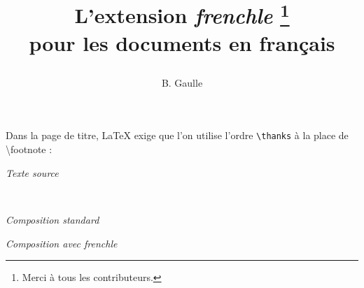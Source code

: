 \documentclass[a4paper,12pt,openright]{article}
\begin{document}
Dans la page de titre, \LaTeX{} exige que l’on utilise l’ordre \texttt{{\backslash}thanks} à la place
de {\backslash}footnote :
\begin{center} %
\textit{Texte source}\\[.3ex]
\begin{boxedverbatim}
\title{L’extension \textit{frenchle}
\thanks{Merci à tous les contributeurs.} \\
pour les documents en français
\author{B. Gaulle}
}
\maketitle
\end{boxedverbatim}
\\[.5ex]
\setcounter{mpfootnote}{1} %
\renewcommand{\thempfootnote}{\arabic{mpfootnote}}
\parbox{70mm}{
\begin{center}
\textit{Composition standard}
%
\end{center}
}%
\parbox{70mm}{
\begin{center}
\textit{Composition avec frenchle}
\fbox{\frenchtypography\frenchlayout%
\begin{tabular}{@{}ll@{}l@{}}
\multicolumn{3}{@{}c}{\large L'extension \textit{frenchle}\footnotemark[1]}\\
\multicolumn{3}{@{}c}{\large pour les documents en français}\\
&\rule{5em}{0pt}\\
\multicolumn{3}{@{}c}{\rule{0pt}{1em}B. Gaulle}\\
\multicolumn{3}{@{}c}{\rule{0pt}{2em}}\\\cline{1-2}
&\multicolumn{2}{l}{\rule{0pt}{1em}\footnotesize1. {Merci à tous les contributeurs}}\\
\end{tabular}%
}%
\end{center}
}
\end{center}
\end{document}
